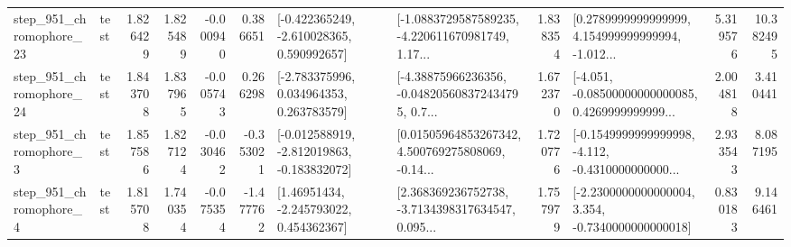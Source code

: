 \begin{tabular}{llrrrrllrlrr}
  step\_951\_chromophore\_23 &      test &      1.826429 &    1.825489 &     -0.000940 &  0.386651 &   [-0.422365249, -2.610028365, 0.590992657] &  [-1.0883729587589235, -4.220611670981749, 1.17... &       1.838354 &  [0.2789999999999999, 4.154999999999994, -1.012... &            5.319576 &         10.382495 \\
  step\_951\_chromophore\_24 &      test &      1.843708 &    1.837965 &     -0.005743 &  0.266298 &    [-2.783375996, 0.034964353, 0.263783579] &  [-4.38875966236356, -0.048205608372434795, 0.7... &       1.672370 &  [-4.051, -0.08500000000000085, 0.4269999999999... &            2.004818 &          3.410441 \\
   step\_951\_chromophore\_3 &      test &      1.857586 &    1.827124 &     -0.030462 & -0.353021 &  [-0.012588919, -2.812019863, -0.183832072] &  [0.01505964853267342, 4.500769275808069, -0.14... &       1.720776 &  [-0.1549999999999998, -4.112, -0.4310000000000... &            2.933543 &          8.087195 \\
   step\_951\_chromophore\_4 &      test &      1.815708 &    1.740354 &     -0.075354 & -1.477762 &     [1.46951434, -2.245793022, 0.454362367] &  [2.368369236752738, -3.7134398317634547, 0.095... &       1.757979 &  [-2.2300000000000004, 3.354, -0.7340000000000018] &            0.830183 &          9.146461 \\
\bottomrule
\end{tabular}


